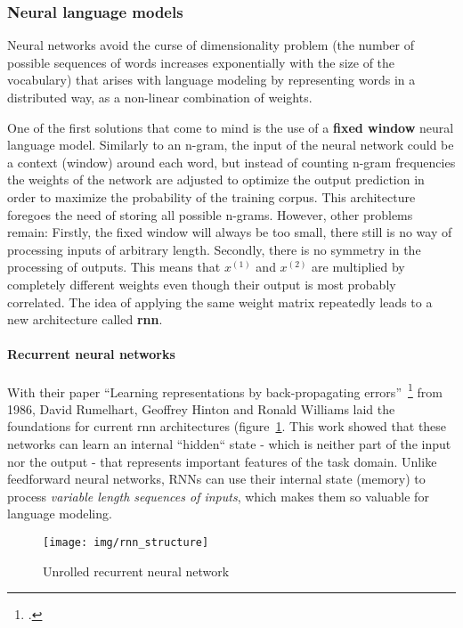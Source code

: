 \subsubsection{Neural language models}
\label{sub:neural_language_models}

Neural networks avoid the curse of dimensionality problem (the number of possible sequences of words increases exponentially with the size of the vocabulary) that arises with language modeling by representing words in a distributed way, as a non-linear combination of weights.

One of the first solutions that come to mind is the use of a \textbf{fixed window} neural language model. Similarly to an n-gram, the input of the neural network could be a context (window) around each word, but instead of counting n-gram frequencies the weights of the network are adjusted to optimize the output prediction in order to maximize the probability of the training corpus. This architecture foregoes the need of storing all possible n-grams. However, other problems remain: Firstly, the fixed window will always be too small, there still is no way of processing inputs of arbitrary length. Secondly, there is no symmetry in the processing of outputs. This means that $ x^{(1)} $ and $ x^{(2)} $ are multiplied by completely different weights even though their output is most probably correlated. The idea of applying the same weight matrix repeatedly leads to a new architecture called \textbf{\gls{rnn}}.

\paragraph{Recurrent neural networks}
With their paper “Learning representations by back-propagating errors”~\footcite{10.5555/65669.104451} from 1986, David Rumelhart, Geoffrey Hinton and Ronald Williams laid the foundations for current \gls{rnn} architectures (figure~\ref{fig:recurrent_neural_network_architecture}. This work showed that these networks can learn an internal “hidden“ state - which is neither part of the input nor the output - that represents important features of the task domain. Unlike feedforward neural networks, RNNs can use their internal state (memory) to process \textit{variable length sequences of inputs}, which makes them so valuable for language modeling.

\begin{figure}[h]
  	\texttt{[image: img/rnn\_structure]}
  	\caption{Unrolled recurrent neural network}
	\label{fig:recurrent_neural_network_architecture}
\end{figure}


